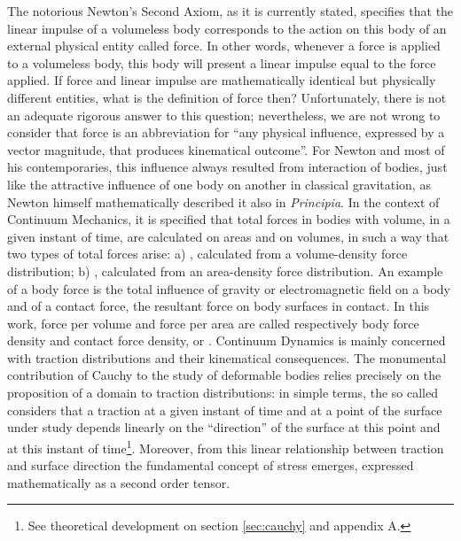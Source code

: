 The notorious Newton's Second Axiom, as it is currently stated, specifies that the linear impulse of a volumeless body corresponds to the action on this body of an external physical entity called force. In other words, whenever a force is applied to a volumeless body, this body will present a linear impulse equal to the force applied. If force and linear impulse are mathematically identical but physically different entities, what is the definition of force then?  Unfortunately, there is not an adequate rigorous answer to this question; nevertheless, we are not wrong to consider that force is an abbreviation for ``any physical influence, expressed by a vector magnitude, that produces kinematical outcome''. For Newton and most of his contemporaries, this influence always resulted from interaction of bodies, just like the attractive influence of one body on another in classical gravitation, as Newton himself mathematically described it also in \emph{Principia}. In the context of Continuum Mechanics, it is specified that total forces in bodies with volume, in a given instant of time, are calculated on areas and on volumes, in such a way that two types of total forces arise: a) , calculated from a volume-density force distribution; b) , calculated from an area-density force distribution. An example of a body force is the total influence of gravity or electromagnetic field on a body and of a contact force, the resultant force on body surfaces in contact. In this work, force per volume and force per area are called respectively body force density and contact force density, or . Continuum Dynamics is mainly concerned with traction distributions and their kinematical consequences. The monumental contribution of Cauchy to the study of deformable bodies relies precisely on the proposition of a domain to traction distributions: in simple terms, the so called  considers that a traction at a given instant of time and at a point of the surface under study depends linearly on the ``direction'' of the surface at this point and at this instant of time\footnote{See theoretical development on section \ref{sec:cauchy} and appendix A.}. Moreover, from this linear relationship between traction and surface direction the fundamental concept of stress emerges, expressed mathematically as a second order tensor.     



